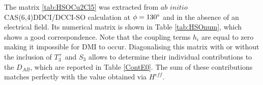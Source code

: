\documentclass[12pt]{report}
\numberwithin{equation}{section}
\begin{document}
\begin{table}[!ht]
    \centering
\caption{Numerical matrix of $\hat{H}^{SO}$ and electronic couplings in the uncoupled basis from a CAS(6,4)DDCI/DDCI-SO calculation with no electric field and $\phi=130\degree$.}
\label{tab:HSOnum}
\end{table}
The matrix \ref{tab:HSOCu2Cl5} was extracted from $ab$ $initio$ CAS(6,4)DDCI/DCCI-SO calculation at $\phi=130\degree$ and in the absence of an electrical field. Its numerical matrix is shown in Table \ref{tab:HSOnum}, which shows a good correspondence. 
Note that the coupling terms $h_i$ are equal to zero making it impossible for DMI to occur.
Diagonalising this matrix with or without the inclusion of $T_3^+$ and $S_3$ allows to determine their individual contributions to the $D_{AB}$, which are reported in Table \ref{ContE0}.
The sum of these contributions matches perfectly with the value obtained via $H^{eff}$.
\end{document}
